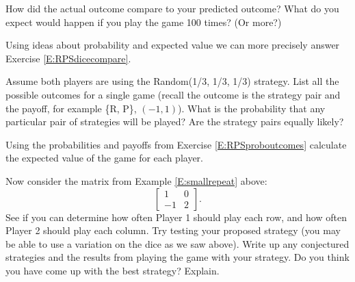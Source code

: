 \begin{xca}\label{E:RPSdicecompare}
How did the actual outcome compare to your predicted outcome? What do you expect would happen if you play the game 100 times? (Or more?) 
\end{xca}


Using ideas about probability and expected value we can more precisely answer Exercise \ref{E:RPSdicecompare}.


\begin{xca}\label{E:RPSproboutcomes}
Assume both players are using the Random(1/3, 1/3, 1/3) strategy. List all the possible outcomes for a single game (recall the outcome is the strategy pair and the payoff, for example \{R, P\}, $(-1, 1)$). What is the probability that any particular pair of strategies will be played? Are the strategy pairs equally likely? 
\end{xca}


\begin{xca}\label{E:RPSexpval}
Using the probabilities and payoffs from Exercise \ref{E:RPSproboutcomes} calculate the expected value of the game for each player.
\end{xca}


\begin{xca}\label{E:smallrepeatstrat}
Now consider the matrix from Example \ref{E:smallrepeat} above: 
\[\left[\begin{matrix}
1&0\\
-1&2

\end{matrix}\right].
\]
See if you can determine how often Player 1 should play each row, and how often Player 2 should play each column. Try testing your proposed strategy (you may be able to use a variation on the dice as we saw above). Write up any conjectured strategies and the results from playing the game with your strategy. Do you think you have come up with the best strategy? Explain.
\end{xca}







 